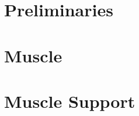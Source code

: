 

\setcounter{tocdepth}{1}
\setcounter{minitocdepth}{1} 

    \dominitoc%
    \adjustmtc[2]%
    \tableofcontents
    \label{toc-contents}

	




%
%
%


\part{Preliminaries}

%



\part{Muscle}







\part{Muscle Support}







